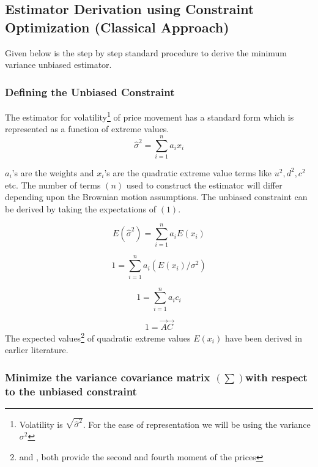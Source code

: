 \documentclass[12pt]{article}   	%
\begin{document}

\subsection{Estimator Derivation using Constraint Optimization (Classical Approach)}

Given below is the step by step standard procedure to derive the minimum variance unbiased estimator. 
\subsubsection{Defining the Unbiased Constraint}
The estimator for volatility\footnote{Volatility is $\sqrt{\hat{\sigma}^2}$. For the ease of representation we will be using the variance $\sigma^2$} of price movement has a standard form which is represented as a function of extreme values.
\begin{equation}
 \hat{\sigma}^2 = \sum_{i=1}^{n} a_i x_i
\end{equation}

$a_i$'s are the weights and $x_i$'s are the quadratic extreme value terms like $u^2, d^2, c^2$ etc. 
The number of terms $(n)$ used to construct the estimator will differ depending upon the Brownian motion assumptions.
The unbiased constraint can be derived by taking the expectations of $(1)$.

\begin{equation}
 E(\hat{\sigma}^2) = \sum_{i=1}^{n} a_i E(x_i)
\end{equation}

\begin{equation}
 1= \sum_{i=1}^{n} a_i (E(x_i)/\sigma^2)
\end{equation}

\begin{equation}
 1= \sum_{i=1}^{n} a_i c_i
\end{equation}

\begin{equation}
 1= \vec{A}\vec{C}
\end{equation}
The expected values\footnote{\citealp{garman1980} and \citealp{meilijson2008}, both provide the second and fourth moment of the prices} of quadratic extreme values $E(x_i )$ have been derived in earlier literature.

\subsubsection{Minimize the variance covariance matrix $(\sum)$with respect to the unbiased constraint}
\end{document}
